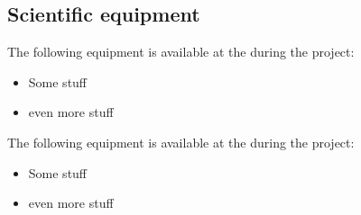 \subsection{Scientific equipment}

\noindent The following equipment is available at the \textit{\GroupA} during the project:
\vspace{-6pt}
 
\begin{itemize}\setlength{\itemsep}{0pt}
\item Some stuff
\item even more stuff
\end{itemize}

\vspace{-6pt}
\noindent The following equipment is available at the \textit{\GroupB} during the project:
\vspace{-6pt}

\begin{itemize}\setlength{\itemsep}{0pt}
\item Some stuff
\item even more stuff
\end{itemize}
